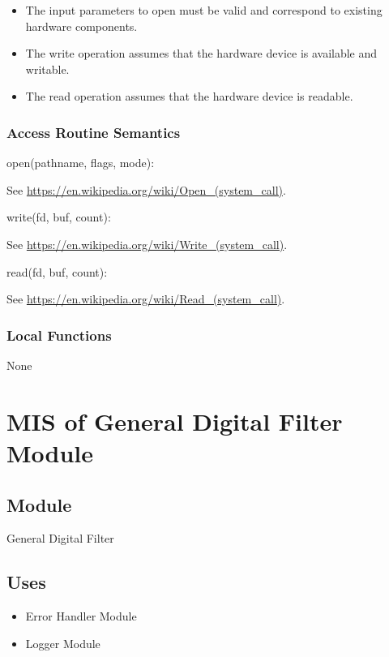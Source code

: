 \documentclass[12pt, titlepage]{article}
\begin{document}
\begin{itemize}
\item The input parameters to open must be valid and correspond to existing
hardware components.
\item The write operation assumes that the hardware device is available and
writable.
\item The read operation assumes that the hardware device is readable.
\end{itemize}

\subsubsection{Access Routine Semantics}

\noindent open(pathname, flags, mode):

See \url{https://en.wikipedia.org/wiki/Open_(system_call)}.

\noindent write(fd, buf, count):

See \url{https://en.wikipedia.org/wiki/Write_(system_call)}.

\noindent read(fd, buf, count):

See \url{https://en.wikipedia.org/wiki/Read_(system_call)}.

\subsubsection{Local Functions}

None

\newpage

\section{MIS of General Digital Filter Module} \label{MIS_GDF}

\subsection{Module}

General Digital Filter

\subsection{Uses}

\begin{itemize}
\item Error Handler Module
\item Logger Module
\end{itemize}
\end{document}
